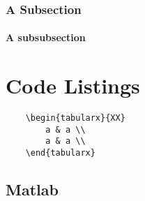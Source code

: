 \documentclass[a4paper,11pt,oneside,showtrims]{alpenthesis}
\begin{document}
\subsection{A Subsection}
\lipsum[1]

\subsubsection{A subsubsection}
\lipsum[2]
\chapter{Code Listings} %
\begin{verbatim}
    \begin{tabularx}{XX}
        a & a \\
        a & a \\
    \end{tabularx}
\end{verbatim}

\tikzexternaldisable
\begin{tcolorbox}[title=test]
    \lipsum[2]
\end{tcolorbox}
\tikzexternalenable

\tikzexternaldisable
\begin{tcolorbox}
    \lipsum[2]
\end{tcolorbox}
\tikzexternalenable

\section{Matlab}
\end{document}
